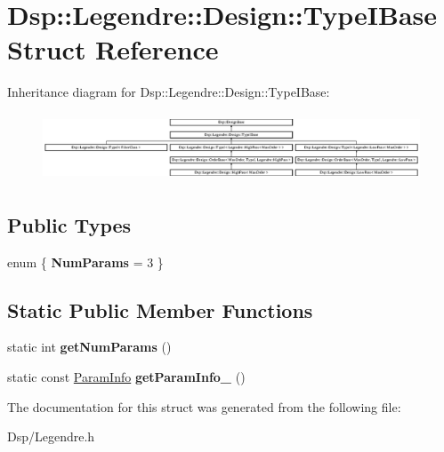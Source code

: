 \hypertarget{structDsp_1_1Legendre_1_1Design_1_1TypeIBase}{\section{Dsp\-:\-:Legendre\-:\-:Design\-:\-:Type\-I\-Base Struct Reference}
\label{structDsp_1_1Legendre_1_1Design_1_1TypeIBase}
}
Inheritance diagram for Dsp\-:\-:Legendre\-:\-:Design\-:\-:Type\-I\-Base\-:\begin{figure}[H]
\begin{center}
\leavevmode
\includegraphics[height=2.033406cm]{structDsp_1_1Legendre_1_1Design_1_1TypeIBase}
\end{center}
\end{figure}
\subsection*{Public Types}
\begin{DoxyCompactItemize}
\item 
enum \{ {\bfseries Num\-Params} =  3
 \}
\end{DoxyCompactItemize}
\subsection*{Static Public Member Functions}
\begin{DoxyCompactItemize}
\item 
\hypertarget{structDsp_1_1Legendre_1_1Design_1_1TypeIBase_abcc75d0baf83a8ab194db9f16e62cf74}{static int {\bfseries get\-Num\-Params} ()}\label{structDsp_1_1Legendre_1_1Design_1_1TypeIBase_abcc75d0baf83a8ab194db9f16e62cf74}

\item 
\hypertarget{structDsp_1_1Legendre_1_1Design_1_1TypeIBase_a9e277e8387673e0738293612e9243b64}{static const \hyperlink{classDsp_1_1ParamInfo}{Param\-Info} {\bfseries get\-Param\-Info\-\_} ()}\label{structDsp_1_1Legendre_1_1Design_1_1TypeIBase_a9e277e8387673e0738293612e9243b64}

\end{DoxyCompactItemize}


The documentation for this struct was generated from the following file\-:\begin{DoxyCompactItemize}
\item 
Dsp/Legendre.\-h\end{DoxyCompactItemize}
